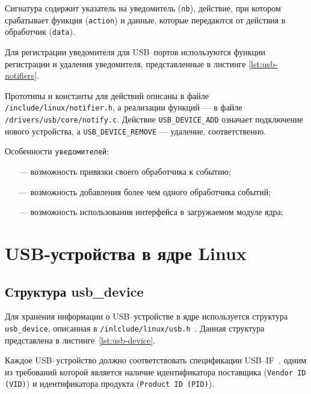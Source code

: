 
Сигнатура содержит указатель на уведомитель (\texttt{nb}), действие, при котором срабатывает функция (\texttt{action}) и данные, которые передаются от действия в обработчик (\texttt{data}).

Для регистрации уведомителя для USB--портов используются функции регистрации и удаления уведомителя, представленные в листинге \ref{lst:usb-notifiers}.


Прототипы и константы для действий описаны в файле \texttt{/include/linux/notifier.h}, а реализации функций --- в файле\\ \texttt{/drivers/usb/core/notify.c}. Действие \texttt{USB\_DEVICE\_ADD} означает подключение нового устройства, а \texttt{USB\_DEVICE\_REMOVE} --- удаление, соответственно.

Особенности \texttt{уведомителей}:

\begin{itemize}
	\item[---] возможность привязки своего обработчика к событию;
	\item[---] возможность добавления более чем одного обработчика событий;
	\item[---] возможность использования интерфейса в загружаемом модуле ядра;
\end{itemize}

\section{USB-устройства в ядре Linux}

\subsection{Структура usb\_device}

Для хранения информации о USB--устройстве в ядре используется структура \texttt{usb\_device}, описанная в \texttt{/inlclude/linux/usb.h}~\cite{usb_device}. Данная структура представлена в листинге~\ref{lst:usb-device}.


Каждое USB--устройство должно соответствовать спецификации USB--IF~\cite{usbspec}, одним из требований которой является наличие идентификатора поставщика (\texttt{Vendor ID (VID)}) и идентификатора продукта (\texttt{Product ID (PID)}). 

